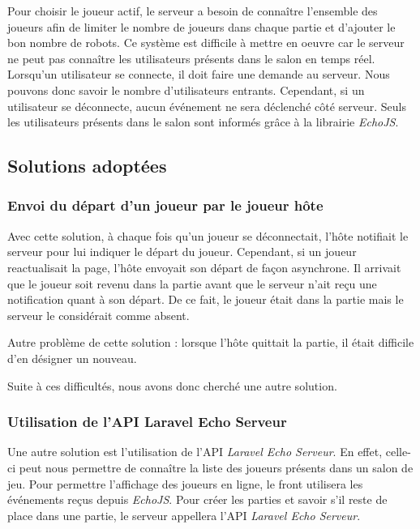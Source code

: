 \documentclass{tnreport}
\begin{document}
Pour choisir le joueur actif, le serveur a besoin de connaître l'ensemble des joueurs afin de limiter le nombre de joueurs dans chaque partie et d'ajouter le bon nombre de robots. Ce système est difficile à mettre en oeuvre car le serveur ne peut pas connaître les utilisateurs présents dans le salon en temps réel. Lorsqu'un utilisateur se connecte, il doit faire une demande au serveur. Nous pouvons donc savoir le nombre d'utilisateurs entrants. Cependant, si un utilisateur se déconnecte, aucun événement ne sera déclenché côté serveur. Seuls les utilisateurs présents dans le salon sont informés grâce à la librairie \textit{EchoJS}.

\subsection{Solutions adoptées}

\subsubsection{Envoi du départ d'un joueur par le joueur hôte}

Avec cette solution, à chaque fois qu'un joueur se déconnectait, l'hôte notifiait le serveur pour lui indiquer le départ du joueur. Cependant, si un joueur reactualisait la page, l'hôte envoyait son départ de façon asynchrone. Il arrivait que le joueur soit revenu dans la partie avant que le serveur n'ait reçu une notification quant à son départ. De ce fait, le joueur était dans la partie mais le serveur le considérait comme absent.

Autre problème de cette solution : lorsque l'hôte quittait la partie, il était difficile d'en désigner un nouveau.

Suite à ces difficultés, nous avons donc cherché une autre solution.

\subsubsection{Utilisation de l'API Laravel Echo Serveur}

Une autre solution est l'utilisation de l'API \textit{Laravel Echo Serveur}. En effet, celle-ci peut nous permettre de connaître la liste des joueurs présents dans un salon de jeu. Pour permettre l'affichage des joueurs en ligne, le front utilisera les événements reçus depuis \textit{EchoJS}. Pour créer les parties et savoir s'il reste de place dans une partie, le serveur appellera l'API \textit{Laravel Echo Serveur}.
\end{document}
